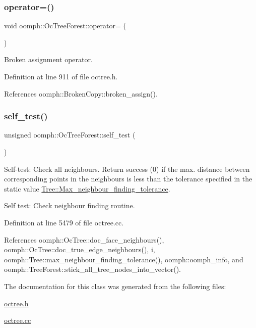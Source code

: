 \subsubsection{\texorpdfstring{operator=()}{operator=()}}
{\footnotesize\ttfamily void oomph\+::\+Oc\+Tree\+Forest\+::operator= (\begin{DoxyParamCaption}\item[{const \hyperlink{classoomph_1_1OcTreeForest}{Oc\+Tree\+Forest} \&}]{ }\end{DoxyParamCaption})\hspace{0.3cm}{\ttfamily [inline]}}



Broken assignment operator. 



Definition at line 911 of file octree.\+h.



References oomph\+::\+Broken\+Copy\+::broken\+\_\+assign().

\mbox{\label{classoomph_1_1OcTreeForest_ac9517c21654bbbe1aa59af28455a40e4}} 
\subsubsection{\texorpdfstring{self\+\_\+test()}{self\_test()}}
{\footnotesize\ttfamily unsigned oomph\+::\+Oc\+Tree\+Forest\+::self\+\_\+test (\begin{DoxyParamCaption}{ }\end{DoxyParamCaption})}



Self-\/test\+: Check all neighbours. Return success (0) if the max. distance between corresponding points in the neighbours is less than the tolerance specified in the static value \hyperlink{classoomph_1_1Tree_aef9abebc166fa3bf81ecb59ec0d5d6b2}{Tree\+::\+Max\+\_\+neighbour\+\_\+finding\+\_\+tolerance}. 

Self test\+: Check neighbour finding routine. 

Definition at line 5479 of file octree.\+cc.



References oomph\+::\+Oc\+Tree\+::doc\+\_\+face\+\_\+neighbours(), oomph\+::\+Oc\+Tree\+::doc\+\_\+true\+\_\+edge\+\_\+neighbours(), i, oomph\+::\+Tree\+::max\+\_\+neighbour\+\_\+finding\+\_\+tolerance(), oomph\+::oomph\+\_\+info, and oomph\+::\+Tree\+Forest\+::stick\+\_\+all\+\_\+tree\+\_\+nodes\+\_\+into\+\_\+vector().



The documentation for this class was generated from the following files\+:\begin{DoxyCompactItemize}
\item 
\hyperlink{octree_8h}{octree.\+h}\item 
\hyperlink{octree_8cc}{octree.\+cc}\end{DoxyCompactItemize}
